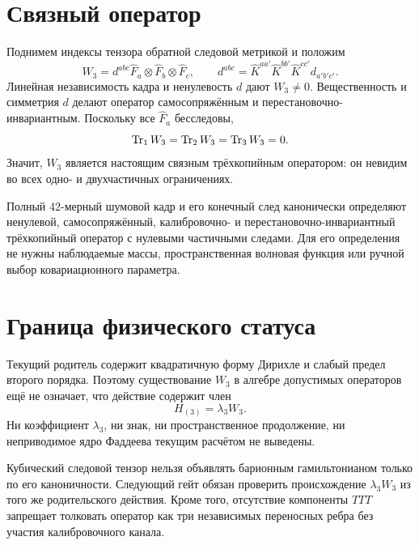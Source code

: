 \section{Связный оператор}

Поднимем индексы тензора обратной следовой метрикой и положим
\begin{equation}
 W_3=d^{abc}\widehat F_a\otimes\widehat F_b\otimes\widehat F_c,
 \qquad
 d^{abc}=\widehat K^{aa'}\widehat K^{bb'}\widehat K^{cc'}d_{a'b'c'}.
 \label{eq:v8-baryon-connected-cubic-operator}
\end{equation}
Линейная независимость кадра и ненулевость $d$ дают $W_3\ne0$.
Вещественность и симметрия $d$ делают оператор самосопряжённым и
перестановочно-инвариантным. Поскольку все $\widehat F_a$ бесследовы,
\begin{equation}
 \operatorname{Tr}_1W_3=\operatorname{Tr}_2W_3=\operatorname{Tr}_3W_3=0.
 \label{eq:v8-baryon-connected-cubic-partial-traces}
\end{equation}
Значит, $W_3$ является настоящим связным трёхкопийным оператором: он
невидим во всех одно- и двухчастичных ограничениях.

\begin{theorem}
Полный 42-мерный шумовой кадр и его конечный след канонически определяют
ненулевой, самосопряжённый, калибровочно- и перестановочно-инвариантный
трёхкопийный оператор с нулевыми частичными следами. Для его определения не
нужны наблюдаемые массы, пространственная волновая функция или ручной выбор
ковариационного параметра.
\end{theorem}

\section{Граница физического статуса}

Текущий родитель содержит квадратичную форму Дирихле и слабый предел второго
порядка. Поэтому существование $W_3$ в алгебре допустимых операторов ещё не
означает, что действие содержит член
\begin{equation}
 H_{(3)}=\lambda_3W_3.
 \label{eq:v8-baryon-cubic-parent-term}
\end{equation}
Ни коэффициент $\lambda_3$, ни знак, ни пространственное продолжение, ни
неприводимое ядро Фаддеева текущим расчётом не выведены.

\begin{nogocriterion}
Кубический следовой тензор нельзя объявлять барионным гамильтонианом только
по его каноничности. Следующий гейт обязан проверить происхождение
$\lambda_3W_3$ из того же родительского действия. Кроме того, отсутствие
компоненты $TTT$ запрещает толковать оператор как три независимых переносных
ребра без участия калибровочного канала.
\end{nogocriterion}

